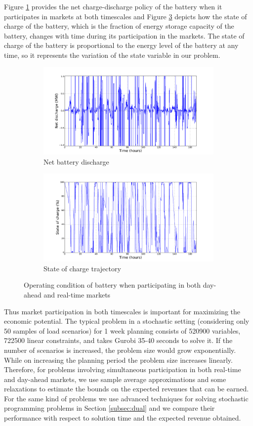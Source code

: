 \documentclass[11pt,twoside]{article}
\begin{document}
Figure \ref{fig:netpower_fp_st} provides the net charge-discharge policy of the battery when it participates in markets at both timescales and Figure \ref{fig:soc_fp_st} depicts how the state of charge of the battery, which is the fraction of energy storage capacity of the battery, changes with time during its participation in the markets. The state of charge of the battery is proportional to the energy level of the battery at any time, so it represents the variation of the state variable in our problem.
\begin{figure}[h!]
\begin{subfigure}{\textwidth}
\centering
\includegraphics[width=0.7\linewidth]{Figures/Plots/fullproblem_stoch/netpower_fp_st.pdf} \caption{Net battery discharge}\label{fig:netpower_fp_st}
\end{subfigure}
\begin{subfigure}{\textwidth}
\centering
\includegraphics[width=0.7\linewidth]{Figures/Plots/fullproblem_stoch/soc_fp_st.pdf} \caption{State of charge trajectory}\label{fig:soc_fp_st}
\end{subfigure}
\caption{Operating condition of battery when participating in both day-ahead and real-time markets}
\end{figure}
\FloatBarrier

Thus market participation in both timescales is important for maximizing the economic potential. The typical problem in a stochastic setting (considering only 50 samples of load scenarios) for 1 week planning consists of 520900 variables, 722500 linear constraints, and takes Gurobi 35-40 seconds to solve it. 
If the number of scenarios is increased, the problem size would grow exponentially. While on increasing the planning period the problem size increases linearly. Therefore, for problems involving simultaneous participation in both real-time and day-ahead markets, we use sample average approximations and some relaxations to estimate the bounds on the expected revenues that can be earned. For the same kind of problems we use advanced techniques for solving stochastic programming problems in Section \ref{subsec:dual} and we compare their performance with respect to solution time and the expected revenue obtained.
\end{document}
